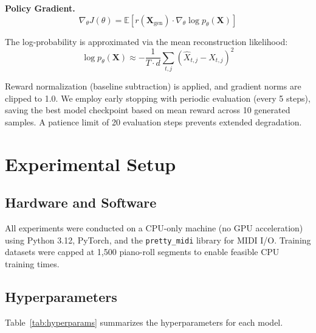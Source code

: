 \documentclass[conference]{IEEEtran}
\begin{document}
\textbf{Policy Gradient.}
\begin{equation}
    \nabla_\theta J(\theta) = \mathbb{E}\left[r(\mathbf{X}_{\text{gen}}) \cdot \nabla_\theta \log p_\theta(\mathbf{X})\right]
\end{equation}

The log-probability is approximated via the mean reconstruction likelihood:
\begin{equation}
    \log p_\theta(\mathbf{X}) \approx -\frac{1}{T \cdot d}\sum_{t,j}(\hat{X}_{t,j} - X_{t,j})^2
\end{equation}

Reward normalization (baseline subtraction) is applied, and gradient norms are clipped to 1.0. We employ early stopping with periodic evaluation (every 5 steps), saving the best model checkpoint based on mean reward across 10 generated samples. A patience limit of 20 evaluation steps prevents extended degradation.

\section{Experimental Setup}

\subsection{Hardware and Software}
All experiments were conducted on a CPU-only machine (no GPU acceleration) using Python 3.12, PyTorch, and the \texttt{pretty\_midi} library for MIDI I/O. Training datasets were capped at 1,500 piano-roll segments to enable feasible CPU training times.

\subsection{Hyperparameters}
Table~\ref{tab:hyperparams} summarizes the hyperparameters for each model.
\end{document}
